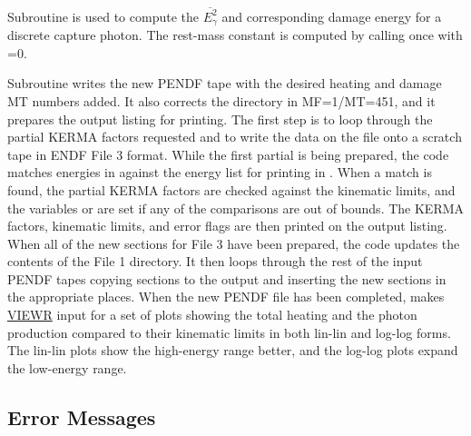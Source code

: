 Subroutine 
is used to compute the $\overline{E_\gamma^2}$ and corresponding
damage energy for a discrete capture photon.  The rest-mass
constant is computed by calling  once with =0.

Subroutine 
writes the new PENDF tape with the desired heating and damage
MT numbers added.  It also corrects the directory in MF=1/MT=451,
and it prepares the output listing for printing.  The first step
is to loop through the partial KERMA factors requested and to write
the data on the  file onto a scratch tape
in ENDF File 3 format.  While the first partial is being
prepared, the code matches energies in  against
the energy list for printing in .  When a match
is found, the partial KERMA factors are checked against the
kinematic limits, and the variables  or
 are set if any of the comparisons are out of
bounds.  The KERMA factors, kinematic limits, and error
flags are then printed on the output listing.  When all of
the new sections for File 3 have been prepared, the code
updates the contents of the File 1 directory.  It then
loops through the rest of the input PENDF tapes copying
sections to the output and inserting the new sections in
the appropriate places.  When the new PENDF file has been
completed,  makes \hyperlink{sVIEWRhy}{VIEWR}
 input for a set of
plots showing the total heating and the photon production
compared to their kinematic limits in both lin-lin and
log-log forms.  The lin-lin plots show the high-energy range
better, and the log-log plots expand the low-energy range.

\subsection{Error Messages}
\label{ssHEATR_msg}

